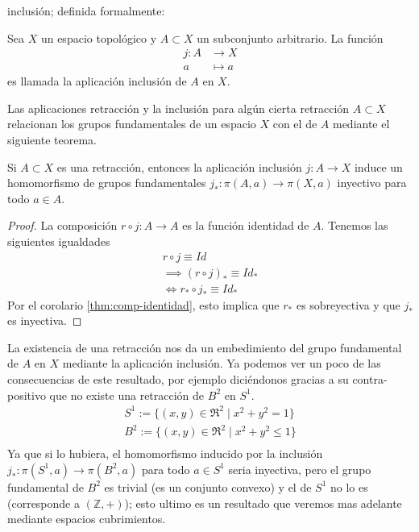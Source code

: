 inclusión; definida formalmente:
\begin{definicion}
  Sea \(X\) un espacio topológico y \(A \subset X\) un subconjunto
  arbitrario. La función
  \begin{align*}
     j : A &\longrightarrow X \\
     a &\longmapsto a
  \end{align*}
  es llamada la aplicación inclusión de \(A\) en \(X\).
\end{definicion}
\noindent Las aplicaciones retracción y la inclusión para algún cierta
retracción \(A \subset X\) relacionan los grupos fundamentales de un
espacio \(X\) con el de \(A\) mediante el siguiente teorema.
\begin{teorema} \label{thm:retraccion-inclusion}
Si \(A \subset X\) es una retracción, entonces la aplicación inclusión
\(j : A \to X\) induce un homomorfismo de grupos fundamentales \(j_{*} :
\pi(A, a) \to \pi(X,a)\) inyectivo para todo \(a \in A\).
\end{teorema}
\begin{proof}
  La composición \(r \circ j : A \to A\) es la función identidad de
  \(A\). Tenemos las siguientes igualdades
  \begin{gather*}
    r \circ j \equiv Id \\
    \implies (r \circ j)_* \equiv Id_* \\
    \iff r_* \circ j_* \equiv Id_*
  \end{gather*}
  Por el corolario \ref{thm:comp-identidad}, esto implica que \(r_{*}\)
  es sobreyectiva y que \(j_{*}\) es inyectiva.
\end{proof}
La existencia de una retracción nos da un embedimiento del grupo fundamental de
\( A \) en \(X\) mediante la aplicación inclusión. Ya podemos ver un
poco de las consecuencias de este resultado, por ejemplo diciéndonos
gracias a su contra-positivo que no existe una retracción de \(B^2\) en
\(S^1\).
\begin{gather*}
  S^1 := \{ (x,y) \in \Re^2 \mid x^2 + y^2 = 1 \} \\
  B^2 := \{ (x,y) \in \Re^2 \mid x^2 + y^2 \leq 1 \} \\
\end{gather*}
Ya que si lo hubiera, el homomorfismo inducido por la inclusión \(j_* :
\pi (S^1, a) \to \pi (B^2, a)\) para todo \(a \in S^1\) seria
inyectiva, pero el grupo fundamental de \(B^2\) es trivial (es un
conjunto convexo) y el de \(S^1\) no lo es (corresponde a \((\mathbb Z,
+)\)); esto ultimo es un resultado que veremos mas adelante mediante
espacios cubrimientos.

